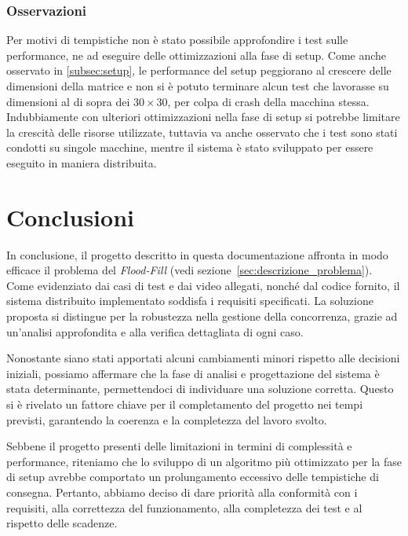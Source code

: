 \documentclass[12pt, a4paper]{report}
\begin{document}
\subsection{Osservazioni}

Per motivi di tempistiche non \`e stato possibile approfondire i test sulle performance, ne ad eseguire delle ottimizzazioni alla fase di setup. Come anche osservato in \ref{subsec:setup}, le performance del setup peggiorano al crescere delle dimensioni della matrice e non si \`e potuto terminare alcun test che lavorasse su dimensioni al di sopra dei $30 \times 30$, per colpa di crash della macchina stessa. Indubbiamente con ulteriori ottimizzazioni nella fase di setup si potrebbe limitare la crescit\`a delle risorse utilizzate, tuttavia va anche osservato che i test sono stati condotti su singole macchine, mentre il sistema \`e stato sviluppato per essere eseguito in maniera distribuita.

\chapter{Conclusioni}

In conclusione, il progetto descritto in questa documentazione affronta in modo efficace il problema del \textit{Flood-Fill} (vedi sezione~\ref{sec:descrizione_problema}). Come evidenziato dai casi di test e dai video allegati, nonché dal codice fornito, il sistema distribuito implementato soddisfa i requisiti specificati. La soluzione proposta si distingue per la robustezza nella gestione della concorrenza, grazie ad un'analisi approfondita e alla verifica dettagliata di ogni caso.

Nonostante siano stati apportati alcuni cambiamenti minori rispetto alle decisioni iniziali, possiamo affermare che la fase di analisi e progettazione del sistema è stata determinante, permettendoci di individuare una soluzione corretta. Questo si \`e rivelato un fattore chiave per il completamento del progetto nei tempi previsti, garantendo la coerenza e la completezza del lavoro svolto.

Sebbene il progetto presenti delle limitazioni in termini di complessità e performance, riteniamo che lo sviluppo di un algoritmo più ottimizzato per la fase di setup avrebbe comportato un prolungamento eccessivo delle tempistiche di consegna. Pertanto, abbiamo deciso di dare priorità alla conformità con i requisiti, alla correttezza del funzionamento, alla completezza dei test e al rispetto delle scadenze.
\end{document}
